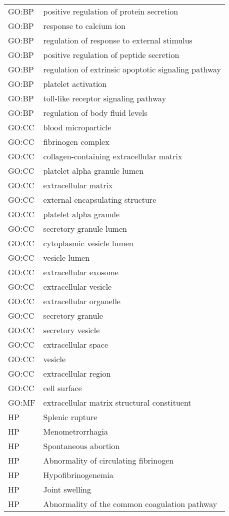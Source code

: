 \begin{longtable}{ll}
GO:BP & positive regulation of protein secretion\\
GO:BP & response to calcium ion\\
GO:BP & regulation of response to external stimulus\\
GO:BP & positive regulation of peptide secretion\\
GO:BP & regulation of extrinsic apoptotic signaling pathway\\
GO:BP & platelet activation\\
GO:BP & toll-like receptor signaling pathway\\
GO:BP & regulation of body fluid levels\\
GO:CC & blood microparticle\\
GO:CC & fibrinogen complex\\
GO:CC & collagen-containing extracellular matrix\\
GO:CC & platelet alpha granule lumen\\
GO:CC & extracellular matrix\\
GO:CC & external encapsulating structure\\
GO:CC & platelet alpha granule\\
GO:CC & secretory granule lumen\\
GO:CC & cytoplasmic vesicle lumen\\
GO:CC & vesicle lumen\\
GO:CC & extracellular exosome\\
GO:CC & extracellular vesicle\\
GO:CC & extracellular organelle\\
GO:CC & secretory granule\\
GO:CC & secretory vesicle\\
GO:CC & extracellular space\\
GO:CC & vesicle\\
GO:CC & extracellular region\\
GO:CC & cell surface\\
GO:MF & extracellular matrix structural constituent\\
HP & Splenic rupture\\
HP & Menometrorrhagia\\
HP & Spontaneous abortion\\
HP & Abnormality of circulating fibrinogen\\
HP & Hypofibrinogenemia\\
HP & Joint swelling\\
HP & Abnormality of the common coagulation pathway\\

\end{longtable}
